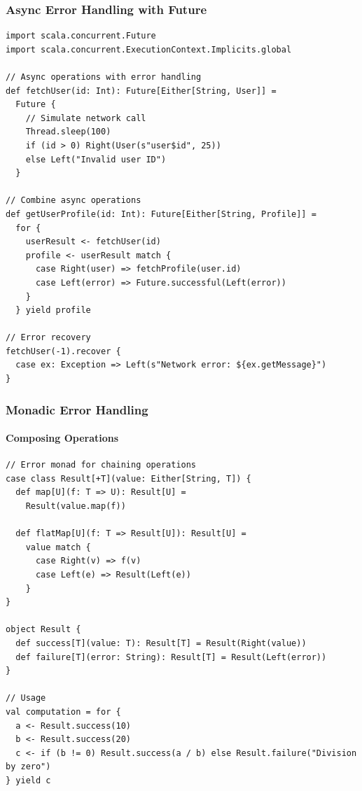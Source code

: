 \documentclass{beamer}
\begin{document}
\begin{frame}[fragile]
\frametitle{Async Error Handling with Future}

\begin{lstlisting}[style=scalaStyle]
import scala.concurrent.Future
import scala.concurrent.ExecutionContext.Implicits.global

// Async operations with error handling
def fetchUser(id: Int): Future[Either[String, User]] = 
  Future {
    // Simulate network call
    Thread.sleep(100)
    if (id > 0) Right(User(s"user$id", 25))
    else Left("Invalid user ID")
  }

// Combine async operations
def getUserProfile(id: Int): Future[Either[String, Profile]] = 
  for {
    userResult <- fetchUser(id)
    profile <- userResult match {
      case Right(user) => fetchProfile(user.id)
      case Left(error) => Future.successful(Left(error))
    }
  } yield profile

// Error recovery
fetchUser(-1).recover {
  case ex: Exception => Left(s"Network error: ${ex.getMessage}")
}
\end{lstlisting}

\end{frame}

\begin{frame}[fragile]
\frametitle{Monadic Error Handling}
\framesubtitle{Composing Operations}

\begin{lstlisting}[style=scalaStyle]
// Error monad for chaining operations
case class Result[+T](value: Either[String, T]) {
  def map[U](f: T => U): Result[U] = 
    Result(value.map(f))
  
  def flatMap[U](f: T => Result[U]): Result[U] = 
    value match {
      case Right(v) => f(v)
      case Left(e) => Result(Left(e))
    }
}

object Result {
  def success[T](value: T): Result[T] = Result(Right(value))
  def failure[T](error: String): Result[T] = Result(Left(error))
}

// Usage
val computation = for {
  a <- Result.success(10)
  b <- Result.success(20)
  c <- if (b != 0) Result.success(a / b) else Result.failure("Division by zero")
} yield c
\end{lstlisting}

\end{frame}
\end{document}
